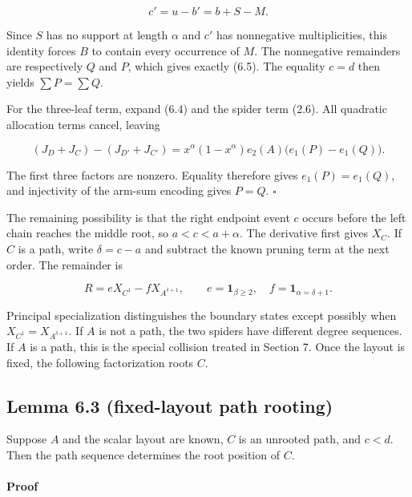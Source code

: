 \documentclass[11pt]{article}
\begin{document}
\begin{equation*}
c'=u-b'=b+S-M.
\end{equation*}


Since $S$ has no support at length $\alpha$ and $c'$ has nonnegative multiplicities, this identity
forces $B$ to contain every occurrence of $M$. The nonnegative remainders are respectively $Q$ and
$P$, which gives exactly (6.5). The equality $c=d$ then yields $\sum P=\sum Q$.

For the three-leaf term, expand (6.4) and the spider term (2.6). All quadratic allocation terms
cancel, leaving

\begin{equation*}
(J_D+J_C)-(J_{D'}+J_{C'})
=x^\alpha(1-x^\alpha)e_2(A)\bigl(e_1(P)-e_1(Q)\bigr).
\tag{6.8}
\end{equation*}


The first three factors are nonzero. Equality therefore gives $e_1(P)=e_1(Q)$, and injectivity of
the arm-sum encoding gives $P=Q$. $\square$

The remaining possibility is that the right endpoint event $c$ occurs before the left chain reaches
the middle root, so $a<c<a+\alpha$. The derivative first gives $X_C$. If $C$ is a path, write
$\delta=c-a$ and subtract the known pruning term at the next order. The remainder is

\begin{equation*}
R=eX_{C^1}-fX_{A^{\delta+1}},
\qquad
e=\mathbf1_{\beta\geq2},\quad f=\mathbf1_{\alpha=\delta+1}.
\tag{6.9}
\end{equation*}


Principal specialization distinguishes the boundary states except possibly when
$X_{C^1}=X_{A^{\delta+1}}$. If $A$ is not a path, the two spiders have different degree sequences.
If $A$ is a path, this is the special collision treated in Section 7. Once the layout is fixed, the
following factorization roots $C$.

\Needspace{0.13\textheight}
\subsection*{Lemma 6.3 (fixed-layout path rooting)}


Suppose $A$ and the scalar layout are known, $C$ is an unrooted path, and $c<d$. Then the path
sequence determines the root position of $C$.

\paragraph{Proof}
\end{document}
